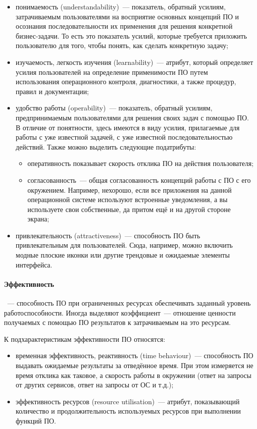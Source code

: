 \documentclass{../../text-style}
\begin{document}
\begin{itemize}
    \item понимаемость (understandability)~--- показатель, обратный усилиям, затрачиваемым пользователями на восприятие основных концепций ПО и осознания последовательности их применения для решения конкретной бизнес-задачи. То есть это показатель усилий, которые требуется приложить пользователю для того, чтобы понять, как сделать конкретную задачу;
    \item изучаемость, легкость изучения (learnability)~--- атрибут, который определяет усилия пользователей на определение применимости ПО путем использования операционного контроля, диагностики, а также процедур, правил и документации;
    \item удобство работы (operability)~--- показатель, обратный усилиям, предпринимаемым пользователями для решения своих задач с помощью ПО. В отличие от понятности, здесь имеются в виду усилия, прилагаемые для работы с уже известной задачей, с уже известной последовательностью действий. Также можно выделить следующие податрибуты:
    \begin{itemize}
        \item оперативность показывает скорость отклика ПО на действия пользователя;
        \item согласованность~--- общая согласованность концепций работы с ПО с его окружением. Например, нехорошо, если все приложения на данной операционной системе используют встроенные уведомления, а вы используете свои собственные, да притом ещё и на другой стороне экрана;
    \end{itemize}
    \item привлекательность (attractiveness)~--- способность ПО быть привлекательным для пользователей. Сюда, например, можно включить модные плоские иконки или другие трендовые и ожидаемые элементы интерфейса.
\end{itemize}

\paragraph{Эффективность}~--- способность ПО при ограниченных ресурсах обеспечивать заданный уровень работоспособности. Иногда выделяют коэффициент~--- отношение ценности получаемых с помощью ПО результатов к затрачиваемым на это ресурсам.

К подхарактеристикам эффективности ПО относятся:

\begin{itemize}
    \item временная эффективность, реактивность (time behaviour)~--- способность ПО выдавать ожидаемые результаты за отведённое время. При этом измеряется не время отклика как таковое, а скорость работы в окружении (ответ на запросы от других сервисов, ответ на запросы от ОС и т.д.);
    \item эффективность ресурсов (resource utilisation)~--- атрибут, показывающий количество и продолжительность используемых ресурсов при выполнении функций ПО.
\end{itemize}
\end{document}
